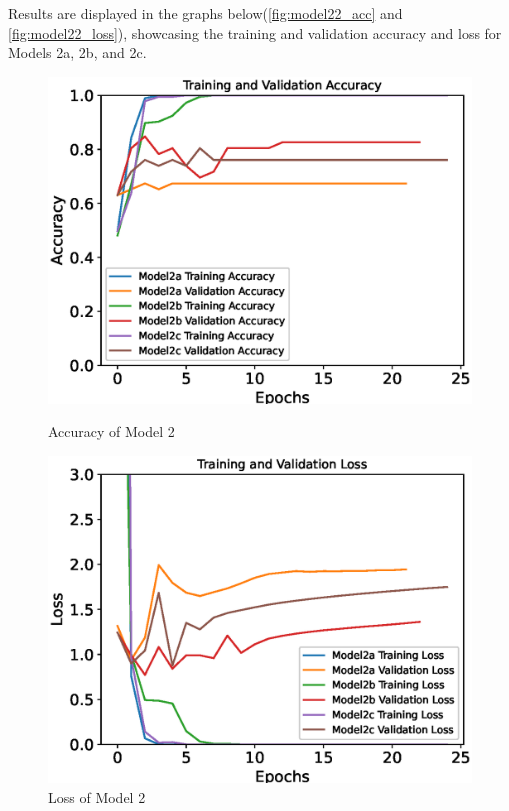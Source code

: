 Results are displayed in the graphs below(\autoref{fig:model22_acc} and \autoref{fig:model22_loss}), showcasing the training and validation accuracy and loss for Models 2a, 2b, and 2c.
\begin{figure}[H]
    \centering
    \begin{minipage}{0.49\textwidth}
        \centering
        \includegraphics[width=\textwidth]{./fig/model2/accuracy22.eps}
        \caption{Accuracy of Model 2}
        \label{fig:model22_acc}
    \end{minipage}
    \begin{minipage}{0.49\textwidth}
        \centering
        \includegraphics[width=\textwidth]{./fig/model2/loss22.eps}
        \caption{Loss of Model 2}
        \label{fig:model22_loss}
    \end{minipage}
\end{figure}


